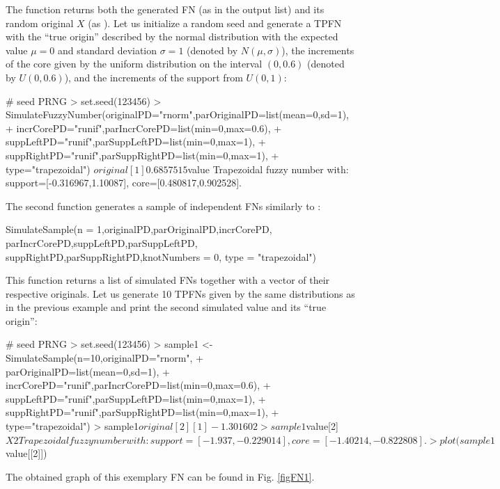 The function  returns both the generated FN (as  in the output list) and its random original $X$ (as ).
Let us initialize a random seed and generate a TPFN with the ``true origin'' described by the normal distribution with the expected value $\mu =0$ and standard deviation $\sigma=1$ (denoted by $N (\mu, \sigma)$), the increments of the core given by the uniform distribution on the interval $(0,0.6)$ (denoted by $U(0,0.6)$), and the increments of the support from $U(0,1)$:
\begin{example}
# seed PRNG
> set.seed(123456)
> SimulateFuzzyNumber(originalPD="rnorm",parOriginalPD=list(mean=0,sd=1),
+  incrCorePD="runif",parIncrCorePD=list(min=0,max=0.6),
+  suppLeftPD="runif",parSuppLeftPD=list(min=0,max=1),
+  suppRightPD="runif",parSuppRightPD=list(min=0,max=1),
+  type="trapezoidal")
$original
[1] 0.6857515
$value
Trapezoidal fuzzy number with:
   support=[-0.316967,1.10087],
   core=[0.480817,0.902528].
\end{example}
The second function generates a sample of  independent FNs similarly to :
\begin{example}
SimulateSample(n = 1,originalPD,parOriginalPD,incrCorePD,
  parIncrCorePD,suppLeftPD,parSuppLeftPD,
  suppRightPD,parSuppRightPD,knotNumbers = 0,
  type = "trapezoidal")
\end{example}
This function returns a list of simulated FNs together with a vector of their respective originals.
Let us generate 10 TPFNs given by the same distributions as in the previous example and print the second simulated value and its ``true origin'':
\begin{example}
# seed PRNG
> set.seed(123456)
> sample1 <- SimulateSample(n=10,originalPD="rnorm",
+  parOriginalPD=list(mean=0,sd=1),
+  incrCorePD="runif",parIncrCorePD=list(min=0,max=0.6),
+  suppLeftPD="runif",parSuppLeftPD=list(min=0,max=1),
+  suppRightPD="runif",parSuppRightPD=list(min=0,max=1),
+  type="trapezoidal")
> sample1$original[2]
[1] -1.301602
> sample1$value[2]
$X2
Trapezoidal fuzzy number with:
   support=[-1.937,-0.229014],
   core=[-1.40214,-0.822808].
> plot(sample1$value[[2]])
\end{example}
The obtained graph of this exemplary FN can be found in Fig. \ref{figFN1}.

